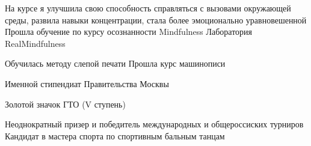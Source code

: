 \documentclass[]{awesome-cv}
\begin{document}
\begin{cventries}
	\cventry
	{\qquad \bullet На курсе я улучшила свою способность справляться с вызовами окружающей среды, развила навыки концентрации, стала более эмоционально уравновешенной}
	{Прошла обучение по курсу осознанности Mindfulness }
	{Лаборатория RealMindfulness}
	{}
	{}
	\end{cventries}  \vspace{-7mm} \begin{cventries}
	\cventry	
	{\qquad \bullet Обучилась методу слепой печати}
	{Прошла курс машинописи}
	{}
	{}
	{}
		\end{cventries}  \vspace{-7mm}\begin{cventries}
	\cventry 
	{}
	{Именной стипендиат Правительства Москвы}
	{}{}{}
		\end{cventries}  \vspace{-11mm} \begin{cventries}
	\cventry	
	{}
	{Золотой значок ГТО (V ступень)}
	{}
	{}
	{}
		\end{cventries}  \vspace{-11mm} \begin{cventries}
	\cventry
	{\qquad Неоднократный призер и победитель международных и общероссиских турниров}
	{Кандидат в мастера спорта по спортивным бальным танцам}
	{}
	{}
	{}
	\end{cventries} \vspace{-10mm}
\end{document}
